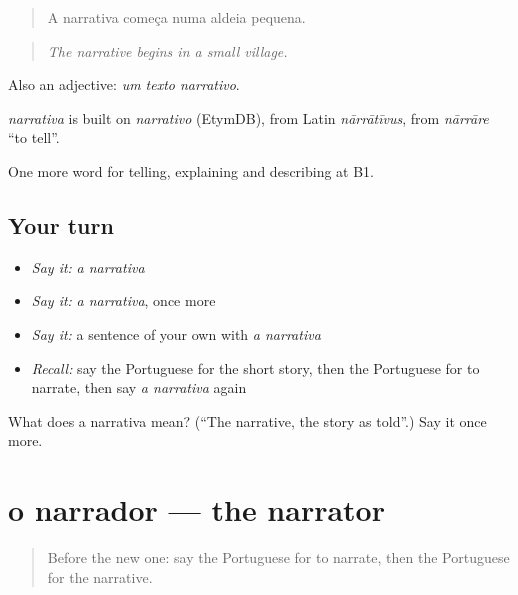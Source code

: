 \begin{quote}
A narrativa começa numa aldeia pequena.
\end{quote}

\begin{quote}
\emph{The narrative begins in a small village.}
\end{quote}

Also an adjective: \emph{um texto narrativo}.

\begin{cousinweb}
\emph{narrativa} is built on \emph{narrativo} (EtymDB), from Latin \emph{nārrātīvus}, from \emph{nārrāre} \textquotedblleft{}to tell\textquotedblright{}.
\end{cousinweb}

\begin{grammarlens}[title={What you've built}]
One more word for telling, explaining and describing at B1.
\end{grammarlens}

\subsection*{Your turn}
\begin{itemize}
\raggedright
  \item \emph{Say it:} \emph{a narrativa}
  \item \emph{Say it:} \emph{a narrativa}, once more
  \item \emph{Say it:} a sentence of your own with \emph{a narrativa}
  \item \emph{Recall:} say the Portuguese for the short story, then the Portuguese for to narrate, then say \emph{a narrativa} again
\end{itemize}

\begin{tcolorbox}[breakable,colback=teal!4,colframe=teal!35!black,title={Before you move on}]
What does a narrativa mean? (\textquotedblleft{}The narrative, the story as told\textquotedblright{}.) Say it once more.
\end{tcolorbox}
\section[o narrador]{o narrador — the narrator}

\label{lesson:PT-C324-narrador}



\begin{quote}
Before the new one: say the Portuguese for to narrate, then the Portuguese for the narrative.
\end{quote}

